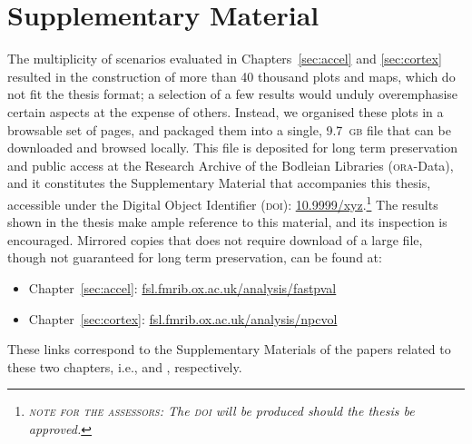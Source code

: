 \chapter{Supplementary Material}
\label{sec:supplmat}
\setstretch{\lspac}

The multiplicity of scenarios evaluated in Chapters~\ref{sec:accel} and \ref{sec:cortex} resulted in the construction of more than 40 thousand plots and maps, which do not fit the thesis format; a selection of a few results would unduly overemphasise certain aspects at the expense of others. Instead, we organised these plots in a browsable set of pages, and packaged them into a single, 9.7~\textsc{gb} file that can be downloaded and browsed locally. This file is deposited for long term preservation and public access at the Research Archive of the Bodleian Libraries (\textsc{ora}-Data), and it constitutes the Supplementary Material that accompanies this thesis, accessible under the Digital Object Identifier (\textsc{doi}): \href{http://dx.doi.org/10.9999/xyz}{10.9999/xyz}.\footnote{{\emph{\color{orange}\textsc{note for the assessors}: The \textsc{doi} will be produced should the thesis be approved.}}} The results shown in the thesis make ample reference to this material, and its inspection is encouraged. Mirrored copies that does not require download of a large file, though not guaranteed for long term preservation, can be found at:

\begin{itemize}
\item Chapter~\ref{sec:accel}: \href{http://fsl.fmrib.ox.ac.uk/analysis/fastpval}{fsl.fmrib.ox.ac.uk/analysis/fastpval}
\item Chapter~\ref{sec:cortex}: \href{http://fsl.fmrib.ox.ac.uk/analysis/npcvol}{fsl.fmrib.ox.ac.uk/analysis/npcvol}
\end{itemize}

These links correspond to the Supplementary Materials of the papers related to these two chapters, i.e.,  \citet{Winkler2016_fast} and \citet{Winkler2016_joint}, respectively.